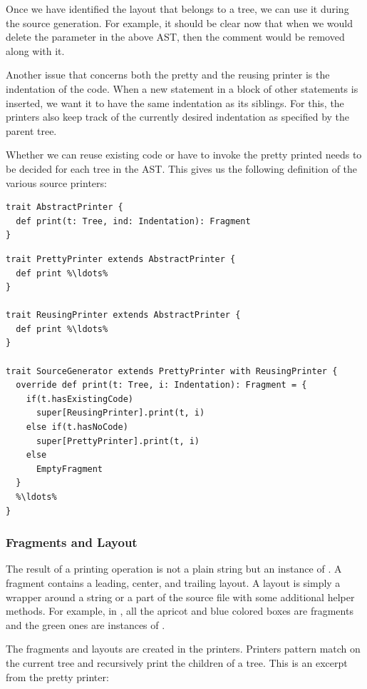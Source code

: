 Once we have identified the layout that belongs to a tree, we can use it during the source generation. For example, it should be clear now that when we would delete the  parameter in the above AST, then the comment would be removed along with it.

Another issue that concerns both the pretty and the reusing printer is the indentation of the code. When a new statement in a block of other statements is inserted, we want it to have the same indentation as its siblings. For this, the printers also keep track of the currently desired indentation as specified by the parent tree. 

Whether we can reuse existing code or have to invoke the pretty printed needs to be decided for each tree in the AST. This gives us the following definition of the various source printers:

\begin{lstlisting}
trait AbstractPrinter {
  def print(t: Tree, ind: Indentation): Fragment
}
\end{lstlisting}
\begin{lstlisting}
trait PrettyPrinter extends AbstractPrinter {
  def print %\ldots%
}

trait ReusingPrinter extends AbstractPrinter {
  def print %\ldots%
}

trait SourceGenerator extends PrettyPrinter with ReusingPrinter {
  override def print(t: Tree, i: Indentation): Fragment = {
    if(t.hasExistingCode)
      super[ReusingPrinter].print(t, i)
    else if(t.hasNoCode)
      super[PrettyPrinter].print(t, i)
    else
      EmptyFragment
  }
  %\ldots%
}
\end{lstlisting}

\subsubsection{Fragments and Layout}

The result of a printing operation is not a plain string but an instance of . A fragment contains a leading, center, and trailing layout. A layout is simply a wrapper around a string or a part of the source file with some additional helper methods. For example, in , all the apricot and blue colored boxes are fragments and the green ones are instances of .

The fragments and layouts are created in the printers. Printers pattern match on the current tree and recursively print the children of a tree. This is an excerpt from the pretty printer:

